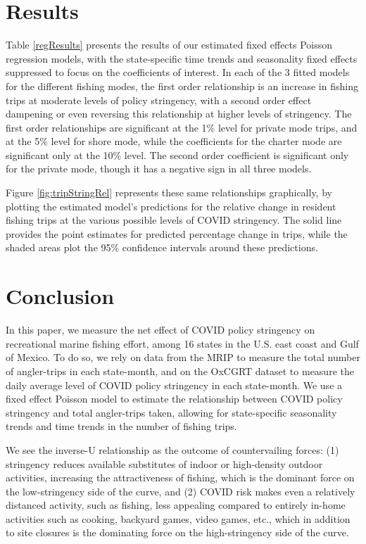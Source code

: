 \documentclass[12pt]{article}
\begin{document}
\section{Results}

Table \ref{regResults} presents the results of our estimated fixed
effects Poisson regression models, with the state-specific time trends
and seasonality fixed effects suppressed to focus on the coefficients of
interest. In each of the 3 fitted models for the different fishing
modes, the first order relationship is an increase in fishing trips at
moderate levels of policy stringency, with a second order effect
dampening or even reversing this relationship at higher levels of
stringency. The first order relationships are significant at the 1\%
level for private mode trips, and at the 5\% level for shore mode, while
the coefficients for the charter mode are significant only at the 10\%
level. The second order coefficient is significant only for the private
mode, though it has a negative sign in all three models.

Figure \ref{fig:tripStringRel} represents these same relationships
graphically, by plotting the estimated model's predictions for the
relative change in resident fishing trips at the various possible levels
of COVID stringency. The solid line provides the point estimates for
predicted percentage change in trips, while the shaded areas plot the
95\% confidence intervals around these predictions.



\section{Conclusion}

In this paper, we measure the net effect of COVID policy stringency on
recreational marine fishing effort, among 16 states in the U.S. east coast and Gulf of Mexico.
To do so, we rely on data from the MRIP to measure the total number of
angler-trips in each state-month, and on the OxCGRT dataset to measure
the daily average level of COVID policy stringency in each state-month. We
use a fixed effect Poisson model to estimate the 
relationship between COVID policy stringency and total angler-trips taken, allowing for state-specific seasonality trends and time
trends in the number of fishing trips.


We see the inverse-U relationship as the outcome of
countervailing forces: (1) stringency reduces available substitutes of
indoor or high-density outdoor activities, increasing the attractiveness
of fishing, which is the dominant force on the low-stringency side of
the curve, and (2) COVID risk makes even a relatively distanced
activity, such as fishing, less appealing compared to entirely in-home
activities such as cooking, backyard games, video games, etc., which in
addition to site closures is the dominating force on the high-stringency
side of the curve.
\end{document}
